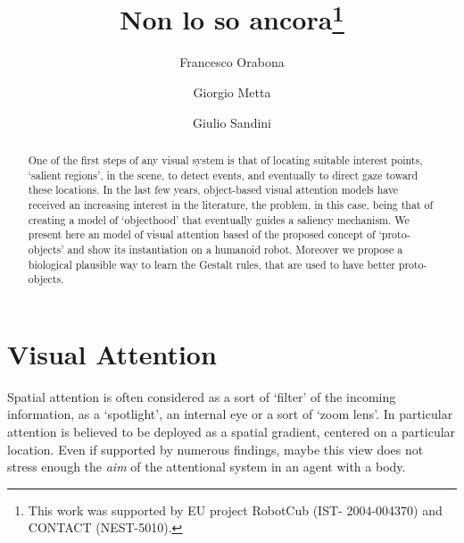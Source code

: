 \documentclass{llncs}
\makeatletter
\DeclareRobustCommand\onedot{\futurelet\@let@token\@onedot}
\def\@onedot{\ifx\@let@token.\else.\null\fi\xspace}
\def\etal{\emph{et al}\onedot}
\makeatother
\begin{document}
\mainmatter

\title{Non lo so ancora\thanks{This work was supported by EU project RobotCub (IST-
2004-004370) and CONTACT (NEST-5010).}}

\author{Francesco Orabona \and Giorgio Metta \and Giulio Sandini}


\maketitle

\begin{abstract}
One of the first
steps of any visual system is that of
locating suitable interest points, `salient regions', in
the scene, to detect events, and eventually to direct
gaze toward these locations. In the last few years,
object-based visual attention models have received an
increasing interest in the literature, the problem, in
this case, being that of creating a model of
`objecthood' that eventually guides a saliency
mechanism. We present here an model of
visual attention based of the proposed concept of
`proto-objects' and show its instantiation on a
humanoid robot. Moreover we propose a biological plausible
way to learn the Gestalt rules, that are used to have
better proto-objects.
\end{abstract}

\section{Visual Attention\label{attention}}

Spatial attention is often considered as a sort of `filter'
of the incoming information, as a `spotlight',
an internal eye or a sort of `zoom lens'. In particular attention is
believed to be deployed as a spatial gradient, centered on a particular location.
Even if supported by numerous findings, maybe this view does not
stress enough the \emph{aim} of the attentional system in an agent with a body.
\end{document}
